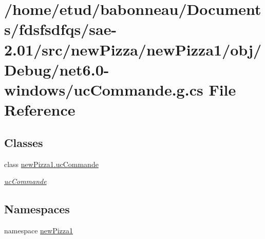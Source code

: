 \hypertarget{Debug_2net6_80-windows_2ucCommande_8g_8cs}{}\section{/home/etud/babonneau/\+Documents/fdsfsdfqs/sae-\/2.01/src/new\+Pizza/new\+Pizza1/obj/\+Debug/net6.0-\/windows/uc\+Commande.g.\+cs File Reference}
\label{Debug_2net6_80-windows_2ucCommande_8g_8cs}
\subsection*{Classes}
\begin{DoxyCompactItemize}
\item 
class \hyperlink{classnewPizza1_1_1ucCommande}{new\+Pizza1.\+uc\+Commande}
\begin{DoxyCompactList}\small\item\em \hyperlink{classnewPizza1_1_1ucCommande}{uc\+Commande} \end{DoxyCompactList}\end{DoxyCompactItemize}
\subsection*{Namespaces}
\begin{DoxyCompactItemize}
\item 
namespace \hyperlink{namespacenewPizza1}{new\+Pizza1}
\end{DoxyCompactItemize}

